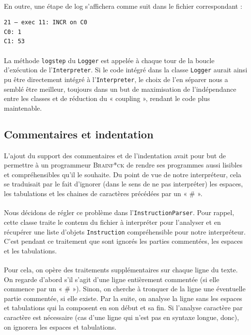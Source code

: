 \documentclass[a4paper]{article}
\begin{document}
\paragraph{}En outre, une étape de log s'affichera comme suit dans le fichier correspondant :
\begin{verbatim}
21 — exec 11: INCR on C0
C0: 1
C1: 53
\end{verbatim}

\paragraph{}La méthode \texttt{logstep} du \texttt{Logger} est appelée à chaque tour de la boucle d'exécution de l'\texttt{Interpreter}. Si le code intégré dans la classe \texttt{Logger} aurait ainsi pu être directement intégré à l'\texttt{Interpreter}, le choix de l'en séparer nous a semblé être meilleur, toujours dans un but de maximisation de l'indépendance entre les classes et de réduction du « coupling », rendant le code plus maintenable.

\subsection{Commentaires et indentation}
\paragraph{}L'ajout du support des commentaires et de l'indentation avait pour but de permettre à un programmeur \textsc{Brainf*ck} de rendre ses programmes aussi lisibles et compréhensibles qu'il le souhaite. Du point de vue de notre interpréteur, cela se traduisait par le fait d'ignorer (dans le sens de ne pas interpréter) les espaces, les tabulations et les chaines de caractères précédées par un « \# ».

\paragraph{}Nous décidons de régler ce problème dans l'\texttt{InstructionParser}. Pour rappel, cette classe traite le contenu du fichier à interpréter pour l'analyser et en récupérer une liste d'objets \texttt{Instruction} compréhensible pour notre interpréteur. C'est pendant ce traitement que sont ignorés les parties commentées, les espaces et les tabulations.

\paragraph{}Pour cela, on opère des traitements supplémentaires sur chaque ligne du texte. On regarde d'abord s'il s'agit d'une ligne entièrement commentée (si elle commence par un « \# »). Sinon, on cherche à tronquer de la ligne une éventuelle partie commentée, si elle existe.  Par la suite, on analyse la ligne sans les espaces et tabulations qui la composent en son début et sa fin. Si l'analyse caractère par caractère est nécessaire (cas d'une ligne qui n'est pas en syntaxe longue, donc), on ignorera les espaces et tabulations.
\end{document}
